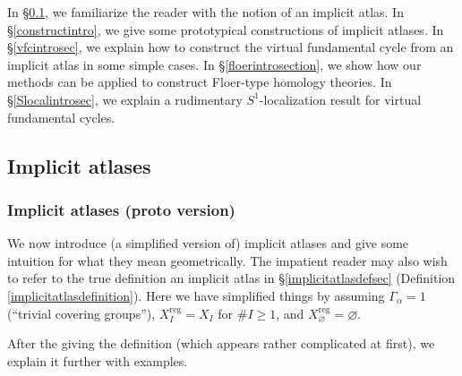 \documentclass[12pt]{article}
\theoremstyle{definition}
\theoremstyle{remark}
\numberwithin{equation}{subsection}
\newcommand{\reg}{\mathrm{reg}}
\begin{document}
In \S\ref{protoIAallsection}, we familiarize the reader with the notion of an implicit atlas.  In \S\ref{constructintro}, we give some prototypical constructions of implicit atlases.  In \S\ref{vfcintrosec}, we explain how to construct the virtual fundamental cycle from an implicit atlas in some simple cases.  In \S\ref{floerintrosection}, we show how our methods can be applied to construct Floer-type homology theories.  In \S\ref{Slocalintrosec}, we explain a rudimentary $S^1$-localization result for virtual fundamental cycles.

\subsection{Implicit atlases}\label{protoIAallsection}

\subsubsection{Implicit atlases (proto version)}\label{protoimplicitatlassection}

We now introduce (a simplified version of) implicit atlases and give some intuition for what they mean geometrically.  The impatient reader may also wish to refer to the true definition an implicit atlas in \S\ref{implicitatlasdefsec} (Definition \ref{implicitatlasdefinition}).  Here we have simplified things by assuming $\Gamma_\alpha=1$ (``trivial covering groups''), $X_I^\reg=X_I$ for $\#I\geq 1$, and $X_\varnothing^\reg=\varnothing$.

After the giving the definition (which appears rather complicated at first), we explain it further with examples.
\end{document}
